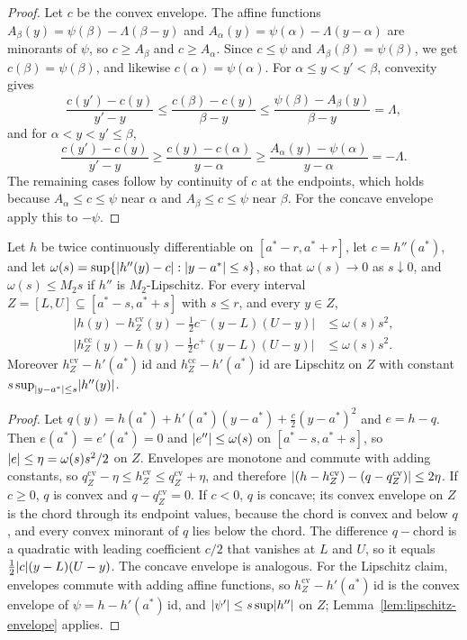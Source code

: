 \begin{proof}
Let $c$ be the convex envelope. The affine functions
$A_\beta(y)=\psi(\beta)-\Lambda(\beta-y)$ and
$A_\alpha(y)=\psi(\alpha)-\Lambda(y-\alpha)$ are minorants of $\psi$, so
$c\ge A_\beta$ and $c\ge A_\alpha$. Since $c\le\psi$ and
$A_\beta(\beta)=\psi(\beta)$, we get $c(\beta)=\psi(\beta)$, and likewise
$c(\alpha)=\psi(\alpha)$. For $\alpha\le y<y'<\beta$, convexity gives
\[
  \frac{c(y')-c(y)}{y'-y}\le\frac{c(\beta)-c(y)}{\beta-y}
  \le\frac{\psi(\beta)-A_\beta(y)}{\beta-y}=\Lambda,
\]
and for $\alpha<y<y'\le\beta$,
\[
  \frac{c(y')-c(y)}{y'-y}\ge\frac{c(y)-c(\alpha)}{y-\alpha}
  \ge\frac{A_\alpha(y)-\psi(\alpha)}{y-\alpha}=-\Lambda.
\]
The remaining cases follow by continuity of $c$ at the endpoints, which
holds because $A_\alpha\le c\le\psi$ near $\alpha$ and $A_\beta\le c\le\psi$
near $\beta$. For the concave envelope apply this to $-\psi$.
\end{proof}

\begin{lemma}\label{lem:envelope-gap}
Let $h$ be twice continuously differentiable on $[a^*-r,a^*+r]$, let
$c=h''(a^*)$, and let $\omega(s)=\sup\{\lvert h''(y)-c\rvert:\lvert y-a^*\rvert\le s\}$,
so that $\omega(s)\to0$ as $s\downarrow0$, and $\omega(s)\le M_2s$ if $h''$ is
$M_2$-Lipschitz. For every interval $Z=[L,U]\subseteq[a^*-s,a^*+s]$ with
$s\le r$, and every $y\in Z$,
\begin{align*}
  \bigl|h(y)-h^{\mathrm{cv}}_Z(y)-\tfrac12c^-(y-L)(U-y)\bigr|&\le\omega(s)s^2,\\
  \bigl|h^{\mathrm{cc}}_Z(y)-h(y)-\tfrac12c^+(y-L)(U-y)\bigr|&\le\omega(s)s^2.
\end{align*}
Moreover $h^{\mathrm{cv}}_Z-h'(a^*)\,\mathrm{id}$ and
$h^{\mathrm{cc}}_Z-h'(a^*)\,\mathrm{id}$ are Lipschitz on $Z$ with constant
$s\sup_{\lvert y-a^*\rvert\le s}\lvert h''(y)\rvert$.
\end{lemma}

\begin{proof}
Let $q(y)=h(a^*)+h'(a^*)(y-a^*)+\tfrac c2(y-a^*)^2$ and $e=h-q$. Then
$e(a^*)=e'(a^*)=0$ and $\lvert e''\rvert\le\omega(s)$ on $[a^*-s,a^*+s]$, so
$\lvert e\rvert\le\eta=\omega(s)s^2/2$ on $Z$. Envelopes are monotone and commute
with adding constants, so $q^{\mathrm{cv}}_Z-\eta\le h^{\mathrm{cv}}_Z\le
q^{\mathrm{cv}}_Z+\eta$, and therefore
$\lvert (h-h^{\mathrm{cv}}_Z)-(q-q^{\mathrm{cv}}_Z)\rvert\le2\eta$. If $c\ge0$, $q$ is
convex and $q-q^{\mathrm{cv}}_Z=0$. If $c<0$, $q$ is concave; its convex
envelope on $Z$ is the chord through its endpoint values, because the chord
is convex and below $q$, and every convex minorant of $q$ lies below the
chord. The difference $q-\text{chord}$ is a quadratic with leading
coefficient $c/2$ that vanishes at $L$ and $U$, so it equals
$\tfrac12\lvert c\rvert(y-L)(U-y)$. The concave envelope is analogous. For the
Lipschitz claim, envelopes commute with adding affine functions, so
$h^{\mathrm{cv}}_Z-h'(a^*)\,\mathrm{id}$ is the convex envelope of
$\psi=h-h'(a^*)\,\mathrm{id}$, and $\lvert \psi'\rvert\le s\sup\lvert h''\rvert$ on $Z$;
Lemma~\ref{lem:lipschitz-envelope} applies.
\end{proof}

